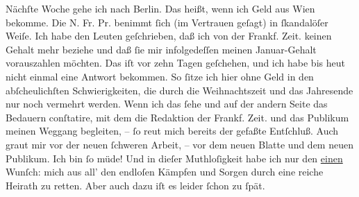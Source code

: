 \pstart
           Nächſte Woche gehe ich nach Berlin. Das heißt,
               wenn ich Geld aus Wien bekomme. Die N. Fr. Pr. benimmt{ }ſich {\pb}(im
               Vertrauen geſagt) in{ }ſkandalöſer Weiſe. Ich habe den Leuten geſchrieben, daß ich von der Frankf. Zeit. keinen Gehalt mehr beziehe und daß{ }ſie mir
               infolgedeſſen meinen Januar-Gehalt vorauszahlen möchten.
               Das iſt vor zehn Tagen geſchehen, und ich habe bis heut nicht einmal eine Antwort bekommen. So{ }ſitze ich hier ohne Geld in
               den abſcheulichſten Schwierigkeiten, die durch die Weihnachtszeit und das Jahresende
               nur noch vermehrt werden. Wenn ich das{ }ſehe und auf der andern Seite das Bedauern
               conſtatire, mit dem die Redaktion der Frankf. Zeit. und das
               Publikum meinen Weggang begleiten, –{ }ſo reut mich bereits der gefaßte Entſchluß. Auch
               graut mir vor der neuen{ }ſchweren Arbeit, – vor dem neuen Blatte und dem neuen Publikum. Ich bin{ }ſo
               müde! Und in dieſer Muthloſigkeit habe ich nur den \uline{einen} Wunſch: mich aus all’  den endloſen Kämpfen und Sorgen durch eine reiche Heirath zu retten. Aber auch
               dazu iſt es leider{ }ſchon zu{ }ſpät.\pend
           
